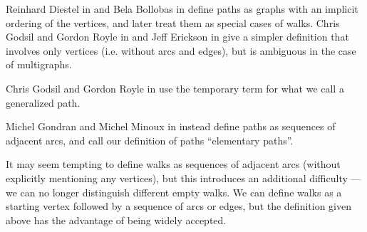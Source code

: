 \begin{comments}
  \item Reinhard Diestel in \cite[6]{Diestel2005} and Bela Bollobas in \cite[4]{Bollobas1998} define paths as  graphs with an implicit ordering of the vertices, and later treat them as special cases of walks. Chris Godsil and Gordon Royle in \cite[165]{GodsilRoyle2001} and Jeff Erickson in \cite[191]{Erickson2019} give a simpler definition that involves only vertices (i.e. without arcs and edges), but is ambiguous in the case of multigraphs.

  \item Chris Godsil and Gordon Royle in \cite[29]{GodsilRoyle2001} use the temporary term  for what we call a generalized path.

  \item Michel Gondran and Michel Minoux in \cite[13]{GondranMinoux1984Graphs} instead define paths as sequences of adjacent arcs, and call our definition of paths \enquote{elementary paths}.

  \item It may seem tempting to define walks as sequences of adjacent arcs (without explicitly mentioning any vertices), but this introduces an additional difficulty --- we can no longer distinguish different empty walks. We can define walks as a starting vertex followed by a sequence of arcs or edges, but the definition given above has the advantage of being widely accepted.
\end{comments}

